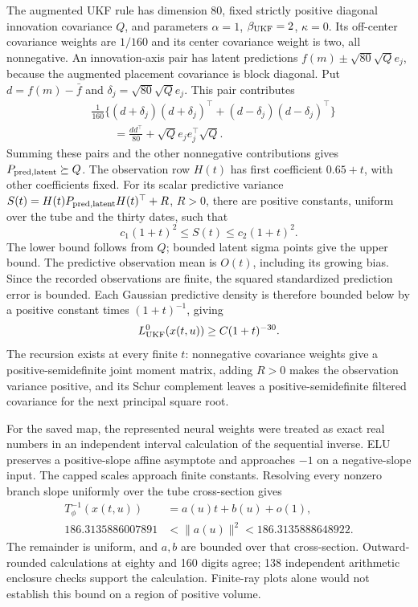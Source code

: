 The augmented UKF rule has dimension $80$, fixed strictly positive diagonal
innovation covariance $Q$, and parameters $\alpha=1$, $\beta_{\rm UKF}=2$,
$\kappa=0$. Its off-center covariance weights are $1/160$ and its center
covariance weight is two, all nonnegative. An innovation-axis pair has latent
predictions $f(m)\pm\sqrt{80}\sqrt Qe_j$, because the augmented placement
covariance is block diagonal. Put $d=f(m)-\bar f$ and
$\delta_j=\sqrt{80}\sqrt Qe_j$. This pair contributes
\begin{align}
 &\frac1{160}\{(d+\delta_j)(d+\delta_j)^\top
                 +(d-\delta_j)(d-\delta_j)^\top\}\nonumber\\
 &\qquad=\frac{dd^\top}{80}+\sqrt Qe_je_j^\top\sqrt Q.
 \label{eq:bf-fab-innovation-bound}
\end{align}
Summing these pairs and the other nonnegative contributions gives
$P_{\rm pred,latent}\succeq Q$. The observation row $H(t)$ has first
coefficient $0.65+t$, with other coefficients fixed. For its scalar predictive
variance $S(t)=H(t)P_{\rm pred,latent}H(t)^\top+R$, $R>0$, there are positive
constants, uniform over the tube and the thirty dates, such that
\begin{equation}
 c_1(1+t)^2\le S(t)\le c_2(1+t)^2.
 \label{eq:bf-fab-observation-tail}
\end{equation}
The lower bound follows from $Q$; bounded latent sigma points give the upper
bound. The predictive observation mean is $O(t)$, including its growing bias.
Since the recorded observations are finite, the squared standardized
prediction error is bounded. Each Gaussian predictive density is therefore
bounded below by a positive constant times $(1+t)^{-1}$, giving
\begin{equation}
 L^0_{\rm UKF}(x(t,u))\ge C(1+t)^{-30}.
 \label{eq:bf-fab-likelihood-lower}
\end{equation}
The recursion exists at every finite $t$: nonnegative covariance weights
give a positive-semidefinite joint moment matrix, adding $R>0$ makes the
observation variance positive, and its Schur complement leaves a
positive-semidefinite filtered covariance for the next principal square root.

For the saved map, the represented neural weights were treated as exact real
numbers in an independent interval calculation of the sequential inverse.
ELU preserves a positive-slope affine asymptote and approaches $-1$ on a
negative-slope input. The capped scales approach finite constants. Resolving
every nonzero branch slope uniformly over the tube cross-section gives
\begin{align}
 T_\phi^{-1}(x(t,u))&=a(u)t+b(u)+o(1),\\
 186.3135886007891&<\|a(u)\|^2<186.3135888648922.
 \label{eq:bf-fab-inverse-tail}
\end{align}
The remainder is uniform, and $a,b$ are bounded over that cross-section.
Outward-rounded calculations at eighty and 160 digits agree; 138 independent
arithmetic enclosure checks support the calculation. Finite-ray plots alone
would not establish this bound on a region of positive volume.

